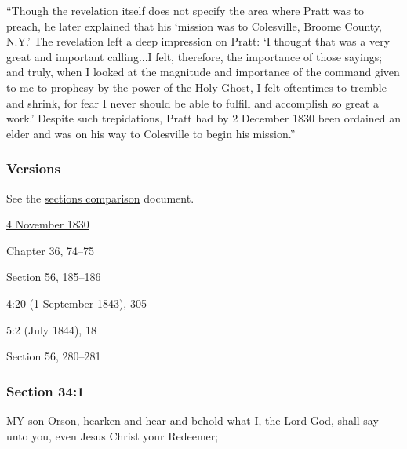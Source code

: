 			``Though the revelation itself does not specify the area where Pratt was to preach, he later explained that his `mission was to Colesville, Broome County, N.Y.' The revelation left a deep impression on Pratt: `I thought that was a very great and important calling...I felt, therefore, the importance of those sayings; and truly, when I looked at the magnitude and importance of the command given to me to prophesy by the power of the Holy Ghost, I felt oftentimes to tremble and shrink, for fear I never should be able to fulfill and accomplish so great a work.' Despite such trepidations, Pratt had by 2 December 1830 been ordained an elder and was on his way to Colesville to begin his mission.''
			
	\subsubsection{Versions}
		\label{DC34-V}
		
		See the \href{https://drive.google.com/file/d/1goAvNz8jS4R8slYfMG_db55Ty2z_vmgK/view?usp=sharing}{sections comparison} document.
	
		\begin{compactdesc}
			\item[JSP] \hyperref[EMS-1830-JS-4-NOV-1830]{4 November 1830}
			\item[BC] Chapter 36, 74--75
			\item[DC 1835] Section 56, 185--186
			\item[TS] 4:20 (1 September 1843), 305
			\item[MS] 5:2 (July 1844), 18
			\item[DC 1844] Section 56, 280--281
		\end{compactdesc}

	\subsubsection{Section 34:1} %
		\label{DC34-1}

		MY son Orson, hearken and hear and behold what I, the Lord God, shall say unto you, even Jesus Christ your Redeemer;


